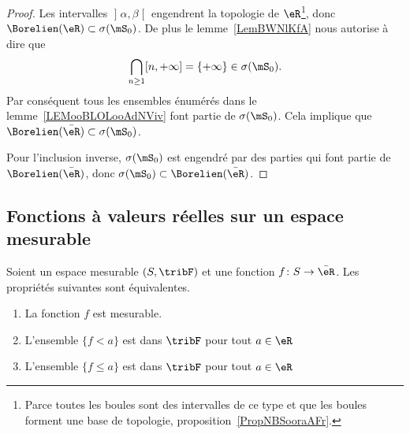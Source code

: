 \begin{proof}
	Les intervalles \( \mathopen] \alpha , \beta \mathclose[\) engendrent la topologie de \( \eR\)\footnote{Parce toutes les boules sont des intervalles de ce type et que les boules forment une base de topologie, proposition~\ref{PropNBSooraAFr}.}, donc \( \Borelien(\eR)\subset\sigma(\mS_0)\). De plus le lemme~\ref{LemBWNlKfA} nous autorise à dire que
	\begin{equation}
		\bigcap_{n\geq 1}\mathopen[ n , +\infty \mathclose]=\{ +\infty \}\in\sigma(\mS_0).
	\end{equation}
	Par conséquent tous les ensembles énumérés dans le lemme~\ref{LEMooBLOLooAdNViv} font partie de \( \sigma(\mS_0)\). Cela implique que \( \Borelien(\bar\eR)\subset\sigma(\mS_0)\).

	Pour l'inclusion inverse, \( \sigma(\mS_0)\) est engendré par des parties qui font partie de \( \Borelien(\bar \eR)\), donc \( \sigma(\mS_0)\subset\Borelien(\bar \eR)\).
\end{proof}

\subsection{Fonctions à valeurs réelles sur un espace mesurable}

\begin{theorem}     \label{THOooWHFLooKYGsOm}
	Soient un espace mesurable \( (S,\tribF)\) et une fonction \( f\colon S\to \bar \eR\). Les propriétés suivantes sont équivalentes.
	\begin{enumerate}
		\item\label{ITEMooHAMHooYLqUhVi}
		      La fonction \( f\) est mesurable.
		\item\label{ITEMooHAMHooYLqUhVii}
		      L'ensemble \( \{ f<a \}\) est dans \( \tribF\) pour tout \( a\in \eR\)
		\item\label{ITEMooHAMHooYLqUhViii}
		      L'ensemble \( \{ f\leq a \}\) est dans \( \tribF\) pour tout \( a\in \eR\)
	\end{enumerate}
\end{theorem}

